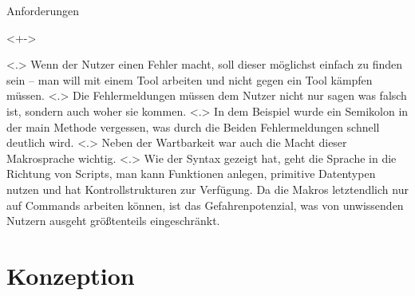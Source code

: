 \begin{frame}{Anforderungen}
\begin{itemize}
        \begin{uncoverenv}<+->%
          \begin{myInvBox}[width=.9\linewidth]
            
          \end{myInvBox}
          \vspace{-6em}
        \end{uncoverenv}
            \note[item]<.>{
              Wenn der Nutzer einen Fehler macht, soll dieser möglichst einfach zu finden sein -- man will mit einem Tool arbeiten und nicht gegen ein Tool kämpfen müssen.
            }
            \note[item]<.>{
              Die Fehlermeldungen müssen dem Nutzer nicht nur sagen was falsch ist, sondern auch woher sie kommen.
            }
            \note[item]<.>{
              In dem Beispiel wurde ein Semikolon in der main Methode vergessen, was durch die Beiden Fehlermeldungen schnell deutlich wird.
            }
        \onslide<+->
            \note[item]<.>{
              Neben der Wartbarkeit war auch die Macht dieser Makrosprache wichtig.
            }
            \note[item]<.>{
              Wie der Syntax gezeigt hat, geht die Sprache in die Richtung von Scripts, man kann Funktionen anlegen, primitive Datentypen nutzen und hat Kontrollstrukturen zur Verfügung. Da die Makros letztendlich nur auf Commands arbeiten können, ist das Gefahrenpotenzial, was von unwissenden Nutzern ausgeht größtenteils eingeschränkt.
            }
    \end{itemize}
  \end{frame}

\section{Konzeption}

